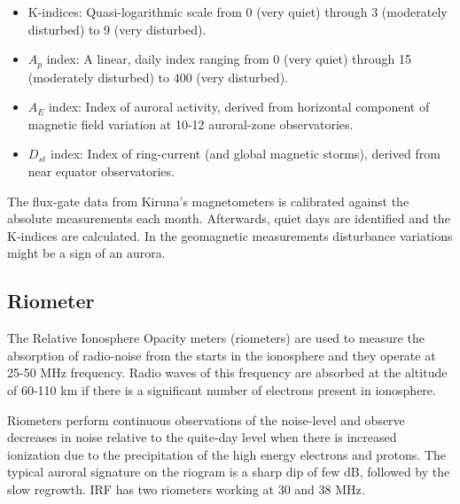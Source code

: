 \documentclass{article}
\begin{document}
\begin{itemize}
\item K-indices: Quasi-logarithmic scale from 0 (very quiet) through 3 (moderately disturbed) to 9 (very disturbed).
\item $A_p$ index: A linear, daily index ranging from 0 (very quiet) through 15 (moderately disturbed) to 400 (very disturbed).
\item $A_E$ index: Index of auroral activity, derived from horizontal component of magnetic field variation at 10-12 auroral-zone observatories.
\item $D_{st}$ index: Index of ring-current (and global magnetic storms), derived from near equator observatories.
\end{itemize}

The flux-gate data from Kiruna's magnetometers is calibrated against the absolute measurements each month. Afterwards, quiet days are identified and the K-indices are calculated. In the geomagnetic measurements disturbance variations might be a sign of an aurora.

\subsection{Riometer}
The Relative Ionosphere Opacity meters (riometers) are used to measure the absorption of radio-noise from the starts in the ionosphere and they operate at 25-50 MHz frequency. Radio waves of this frequency are absorbed at the altitude of 60-110 km if there is a significant number of electrons present in ionosphere.

Riometers perform continuous observations of the noise-level and observe decreases in noise relative to the quite-day level when there is increased ionization due to the precipitation of the high energy electrons and protons. The typical auroral signature on the riogram is a sharp dip of few dB, followed by the slow regrowth. IRF has two riometers working at 30 and 38 MHz.
\end{document}
